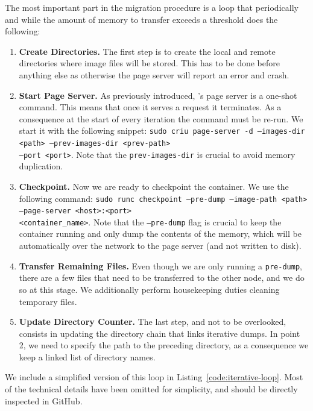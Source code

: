 The most important part in the migration procedure is a loop that periodically and while the amount of memory to transfer exceeds a threshold does the following:
\begin{enumerate}
    \item \textbf{Create Directories.} The first step is to create the local and remote directories where image files will be stored. This has to be done before anything else as otherwise the page server will report an error and crash.
    \item \textbf{Start Page Server.} As previously introduced, \criu's page server is a one-shot command. This means that once it serves a request it terminates. As a consequence at the start of every iteration the command must be re-run. We start it with the following snippet: \texttt{sudo criu page-server -d --images-dir <path> --prev-images-dir <prev-path>} \\\texttt{--port <port>}. Note that the \texttt{prev-images-dir} is crucial to avoid memory duplication.
    \item \textbf{Checkpoint.} Now we are ready to checkpoint the container. We use the following command: \texttt{sudo runc checkpoint --pre-dump --image-path <path> --page-server <host>:<port>} \\\texttt{<container\_name>}. Note that the \texttt{--pre-dump} flag is crucial to keep the container running and only dump the contents of the memory, which will be automatically over the network to the page server (and not written to disk).
    \item \textbf{Transfer Remaining Files.} Even though we are only running a \texttt{pre-dump}, there are a few files that need to be transferred to the other node, and we do so at this stage. We additionally perform housekeeping duties cleaning temporary files.
    \item \textbf{Update Directory Counter.} The last step, and not to be overlooked, consists in updating the directory chain that links iterative dumps. In point 2, we need to specify the path to the preceding directory, as a consequence we keep a linked list of directory names.
\end{enumerate}
We include a simplified version of this loop in Listing~\ref{code:iterative-loop}.
Most of the technical details have been omitted for simplicity, and should be directly inspected in GitHub.
